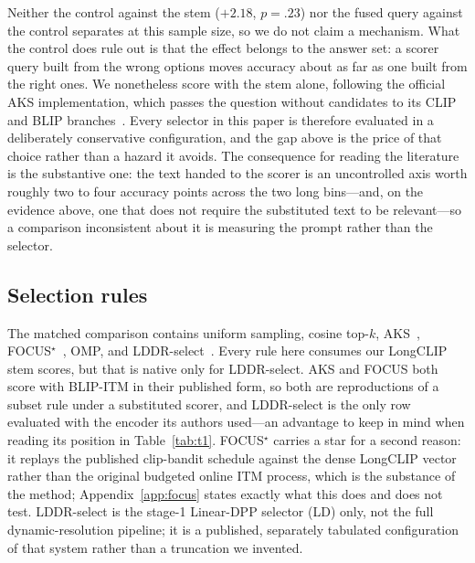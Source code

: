 \documentclass[11pt]{article}
\begin{document}
Neither the control against the stem (${+}2.18$, $p{=}.23$) nor the fused query against the control separates at this sample size, so we do not claim a mechanism.
What the control does rule out is that the effect belongs to the answer set: a scorer query built from the wrong options moves accuracy about as far as one built from the right ones.
We nonetheless score with the stem alone, following the official AKS implementation, which passes the question without candidates to its CLIP and BLIP branches~\citep{tang2025aks}.
Every selector in this paper is therefore evaluated in a deliberately conservative configuration, and the gap above is the price of that choice rather than a hazard it avoids.
The consequence for reading the literature is the substantive one: the text handed to the scorer is an uncontrolled axis worth roughly two to four accuracy points across the two long bins---and, on the evidence above, one that does not require the substituted text to be relevant---so a comparison inconsistent about it is measuring the prompt rather than the selector.

\subsection{Selection rules}

The matched comparison contains uniform sampling, cosine top-$k$, AKS~\citep{tang2025aks}, FOCUS$^\star$~\citep{zhu2025focus}, OMP, and LDDR-select~\citep{chen2026lddr}.
Every rule here consumes our LongCLIP stem scores, but that is native only for LDDR-select.
AKS and FOCUS both score with BLIP-ITM in their published form, so both are reproductions of a subset rule under a substituted scorer, and LDDR-select is the only row evaluated with the encoder its authors used---an advantage to keep in mind when reading its position in Table~\ref{tab:t1}.
FOCUS$^\star$ carries a star for a second reason: it replays the published clip-bandit schedule against the dense LongCLIP vector rather than the original budgeted online ITM process, which is the substance of the method; Appendix~\ref{app:focus} states exactly what this does and does not test.
LDDR-select is the stage-1 Linear-DPP selector (LD) only, not the full dynamic-resolution pipeline; it is a published, separately tabulated configuration of that system rather than a truncation we invented.
\end{document}
